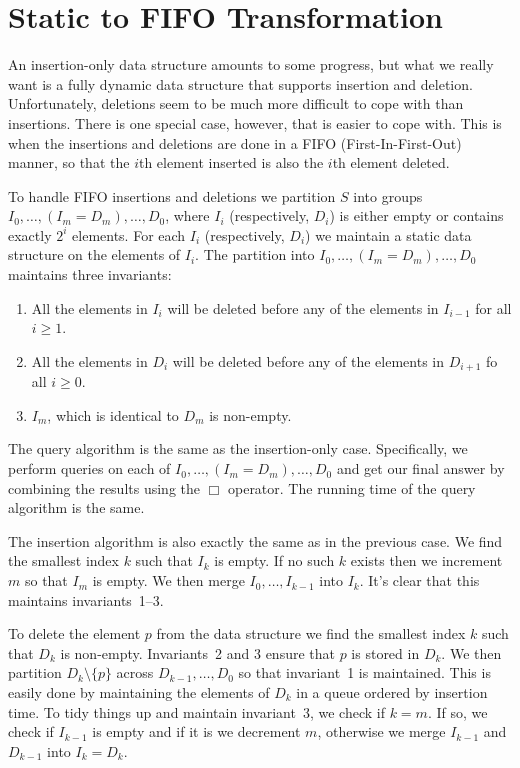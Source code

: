 \section{Static to FIFO Transformation}

An insertion-only data structure amounts to some progress, but what we
really want is a fully dynamic data structure that supports insertion
and deletion.  Unfortunately, deletions seem to be much more difficult
to cope with than insertions.  There is one special case, however,
that is easier to cope with.  This is when the insertions and
deletions are done in a FIFO (First-In-First-Out) manner, so that the
$i$th element inserted is also the $i$th element deleted.

To handle FIFO insertions and deletions we partition $S$ into groups
$I_0,\ldots,(I_m=D_m),\ldots,D_0$, where $I_i$ (respectively, $D_i$)
is either empty or contains exactly $2^i$ elements.  For each $I_i$
(respectively, $D_i$) we maintain a static data structure on the
elements of $I_i$.  The partition into $I_0,\ldots,(I_m=D_m),\ldots,D_0$
maintains three invariants:

\begin{enumerate}
\item All the elements in $I_i$ will be deleted before any of the elements
	in $I_{i-1}$ for all $i\ge 1$.
\item All the elements in $D_i$ will be deleted before any of the elements
	in $D_{i+1}$ fo all $i\ge 0$.
\item $I_m$, which is identical to $D_m$ is non-empty.
\end{enumerate}

The query algorithm is the same as the insertion-only case.
Specifically, we perform queries on each of
$I_0,\ldots,(I_m=D_m),\ldots,D_0$ and get our final answer by
combining the results using the $\Box$ operator.  The running time
of the query algorithm is the same.

The insertion algorithm is also exactly the same as in the previous
case.  We find the smallest index $k$ such that $I_k$ is empty.  If no
such $k$ exists then we increment $m$ so that $I_m$ is empty.  We then
merge $I_{0},\ldots,I_{k-1}$ into $I_k$.  It's clear that this maintains
invariants~1--3.

To delete the element $p$ from the data structure we find the smallest
index $k$ such that $D_k$ is non-empty.  Invariants~2 and 3 ensure
that $p$ is stored in $D_k$.  We then partition $D_k\setminus\{p\}$
across $D_{k-1},\ldots,D_{0}$ so that invariant~1 is maintained.  This
is easily done by maintaining the elements of $D_k$ in a queue ordered
by insertion time.  To tidy things up and maintain invariant~3, we
check if $k=m$.  If so, we check if $I_{k-1}$ is empty and if it is we
decrement $m$, otherwise we merge $I_{k-1}$ and $D_{k-1}$ into
$I_{k}=D_{k}$.

